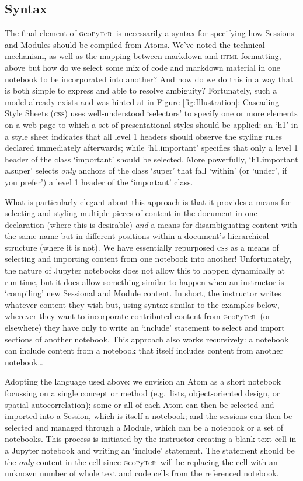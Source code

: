 \documentclass[letter, 11pt]{article}
\newcommand{\gp}{\textsc{g}eo\textsc{p}y\textsc{t}e\textsc{r}~\/}
\newcommand{\eg}{e.g.~\/}
\begin{document}
\subsection{Syntax}\label{syntax}

The final element of \gp is necessarily a syntax for specifying how Sessions and
Modules should be compiled from Atoms. We've noted the technical mechanism, as
well as the mapping between markdown and \textsc{html} formatting, above but how
do we select some mix of code and markdown material in one notebook to be
incorporated into another? And how do we do this in a way that is both simple to
express and able to resolve ambiguity? Fortunately, such a model already exists
and was hinted at in Figure \ref{fig:Illustration}: Cascading Style Sheets
(\textsc{css}) uses well-understood `selectors' to specify one or more elements
on a web page to which a set of presentational styles should be applied: an `h1'
in a style sheet indicates that all level 1 headers should observe the styling
rules declared immediately afterwards; while `h1.important' specifies that only
a level 1 header of the class `important' should be selected. More powerfully,
`h1.important a.super' selects \emph{only} anchors of the class `super' that
fall `within' (or `under', if you prefer') a level 1 header of the `important'
class.

What is particularly elegant about this approach is that it provides a means for
selecting and styling multiple pieces of content in the document in one
declaration (where this is desirable) \textit{and} a means for disambiguating
content with the same name but in different positions within a document's
hierarchical structure (where it is not). We have essentially repurposed
\textsc{css} as a means of selecting and importing content from one notebook
into another! Unfortunately, the nature of Jupyter notebooks does not allow this
to happen dynamically at run-time, but it does allow something similar to happen
when an instructor is `compiling' new Sessional and Module content. In short,
the instructor writes whatever content they wish but, using syntax similar to
the examples below, wherever they want to incorporate contributed content from
\gp (or elsewhere) they have only to write an `include' statement to select and
import sections of another notebook. This approach also works recursively: a
notebook can include content from a notebook that itself includes content from
another notebook\ldots

Adopting the language used above: we envision an Atom as a short notebook
focussing on a single concept or method (\eg lists, object-oriented design, or
spatial autocorrelation); some or all of each Atom can then be selected and
imported into a Session, which is itself a notebook; and the sessions can then
be selected and managed through a Module, which can be a notebook or a set of
notebooks. This process is initiated by the instructor creating a blank text
cell in a Jupyter notebook and writing an `include' statement. The statement
should be the \textit{only} content in the cell since \gp will be replacing the
cell with an unknown number of whole text and code cells from the referenced
notebook.
\end{document}
